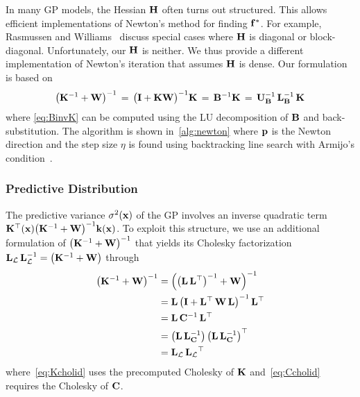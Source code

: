 In many GP models, the Hessian \(\mathbf{H}\) often turns out structured.
This allows efficient implementations of Newton's method for finding \(\mathbf{f}^*\).
For example, Rasmussen and Williams~\cite{rasmussen_gaussian_2006} discuss special cases where \(\mathbf{H}\) is diagonal or block-diagonal.
Unfortunately, our \(\mathbf{H}\) is neither.
We thus provide a different implementation of Newton's iteration that assumes \(\mathbf{H}\) is dense.
Our formulation is based on 
{\small
\begin{align}
  {\big(\mathbf{K}^{-1} + \mathbf{W}\big)}^{-1}
  \,=\, {{\big(\mathbf{I} + \mathbf{K} \mathbf{W} \big)}^{-1} \mathbf{K}} 
  \,=\, \mathbf{B}^{-1} \mathbf{K} 
  \,=\, \mathbf{U}_{\mathbf{B}}^{-1} \, \mathbf{L}_{\mathbf{B}}^{-1} \, \mathbf{K}\label{eq:BinvK}
\end{align}
}%
{\noindent}where \cref{eq:BinvK} can be computed using the LU decomposition of \(\mathbf{B}\) and back-substitution.
The algorithm is shown in~\cref{alg:newton} where \(\mathbf{p}\) is the Newton direction and the step size \(\eta\) is found using backtracking line search with Armijo's condition~\cite{nocedal_numerical_2006}.

\subsubsection{Predictive Distribution}
The predictive variance \(\sigma^2(\mathbf{x})\) of the GP involves an inverse quadratic term \(\mathbf{K}^{\top}(\mathbf{x}) {\big(\mathbf{K}^{-1} + \mathbf{W}\big)}^{-1} \mathbf{k}(\mathbf{x})\).
To exploit this structure, we use an additional formulation of \({\big(\mathbf{K}^{-1} + \mathbf{W}\big)}^{-1}\) that yields its Cholesky factorization \(\mathbf{L}_{\mathcal{L}} \, \mathbf{L}^{-1}_{\mathcal{L}}  = {\big(\mathbf{K}^{-1} + \mathbf{W}\big)}\) through 
\begin{align}
  {\big(\mathbf{K}^{-1} + \mathbf{W}\big)}^{-1}
  &= { \Big({\big(\mathbf{L}\,\mathbf{L}^{\top}\big)}^{-1} + \mathbf{W} \Big) }^{-1} \label{eq:Kcholid}  \\
  &= \mathbf{L}\,{\big(\mathbf{I} + \mathbf{L}^{\top}\,\mathbf{W}\,\mathbf{L} \big)}^{-1}\,\mathbf{L}^{\top}  \\
  &= \mathbf{L}\, \mathbf{C}^{-1} \,\mathbf{L}^{\top}  \\
  &= \big( \mathbf{L}\, \mathbf{L}_{\mathbf{C}}^{-1} \big)\, {\big( \mathbf{L}\, \mathbf{L}_{\mathbf{C}}^{-1} \big)}^{\top} \label{eq:Ccholid} \\
  &= \mathbf{L}_{\mathcal{L}} \, { \mathbf{L}_{\mathcal{L}} }^{\top}
\end{align}
where~\cref{eq:Kcholid} uses the precomputed Cholesky of \(\mathbf{K}\) and~\cref{eq:Ccholid} requires the Cholesky of \(\mathbf{C}\).

